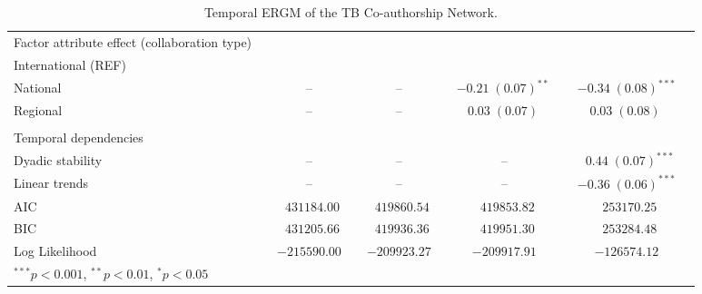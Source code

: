 \begin{table}
\begin{center}
\begin{tabular}{@{}lcclclclcl@{}}
Factor attribute effect (collaboration type) & & & & & & & & \\
\hspace{10pt}International (REF) & & & & & & & & \\
\hspace{10pt}National  &  &  --   &  &   --   &  & $-0.21 \; (0.07)^{**~}$ &  & $-0.34 \; (0.08)^{***}$ \\
\hspace{10pt}Regional &  &    --  &  &   --   &  & $\hspace{6pt}0.03 \; (0.07)^{~~~~}$ &  & $\hspace{6pt}0.03 \; (0.08)^{~~~~}$    \\\\
Temporal dependencies & & & & & & & & \\
\hspace{10pt}Dyadic stability  &  &  --  &  &  -- &  &   --  &  & $\hspace{6pt}0.44 \; (0.07)^{***}$  \\
\hspace{10pt}Linear trends     &  &  --  &  &  -- &  &   --  &  & $-0.36 \; (0.06)^{***}$ \\
\midrule
AIC    & & $\hspace{6pt}431184.00$   & & $\hspace{6pt}419860.54$ & & $\hspace{6pt}419853.82$ & & $\hspace{6pt}253170.25$   \\
BIC    & & $\hspace{6pt}431205.66$ & & $\hspace{6pt}419936.36$ & & $\hspace{6pt}419951.30$ & & $\hspace{6pt}253284.48$    \\
Log Likelihood    & & $-215590.00$ & & $-209923.27$ & & $-209917.91$ & & $-126574.12$ \\
\bottomrule
\multicolumn{5}{l}{\scriptsize{$^{***}p<0.001$, $^{**}p<0.01$, $^*p<0.05$}}
\end{tabular}
\caption{Temporal ERGM of the TB Co-authorship Network.}
\label{tab:tb_tergm}
\end{center}
\end{table}
